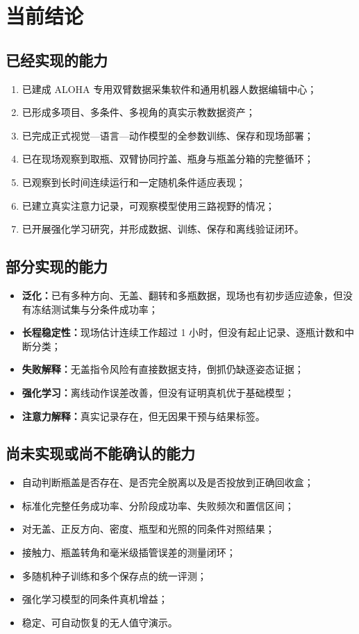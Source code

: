 \chapter{当前结论}

\section{已经实现的能力}

\begin{enumerate}
  \item 已建成 ALOHA 专用双臂数据采集软件和通用机器人数据编辑中心；
  \item 已形成多项目、多条件、多视角的真实示教数据资产；
  \item 已完成正式视觉—语言—动作模型的全参数训练、保存和现场部署；
  \item 已在现场观察到取瓶、双臂协同拧盖、瓶身与瓶盖分箱的完整循环；
  \item 已观察到长时间连续运行和一定随机条件适应表现；
  \item 已建立真实注意力记录，可观察模型使用三路视野的情况；
  \item 已开展强化学习研究，并形成数据、训练、保存和离线验证闭环。
\end{enumerate}

\section{部分实现的能力}

\begin{itemize}
  \item \textbf{泛化：}已有多种方向、无盖、翻转和多瓶数据，现场也有初步适应迹象，但没有冻结测试集与分条件成功率；
  \item \textbf{长程稳定性：}现场估计连续工作超过 1 小时，但没有起止记录、逐瓶计数和中断分类；
  \item \textbf{失败解释：}无盖指令风险有直接数据支持，倒抓仍缺逐姿态证据；
  \item \textbf{强化学习：}离线动作误差改善，但没有证明真机优于基础模型；
  \item \textbf{注意力解释：}真实记录存在，但无因果干预与结果标签。
\end{itemize}

\section{尚未实现或尚不能确认的能力}

\begin{itemize}
  \item 自动判断瓶盖是否存在、是否完全脱离以及是否投放到正确回收盒；
  \item 标准化完整任务成功率、分阶段成功率、失败频次和置信区间；
  \item 对无盖、正反方向、密度、瓶型和光照的同条件对照结果；
  \item 接触力、瓶盖转角和毫米级插管误差的测量闭环；
  \item 多随机种子训练和多个保存点的统一评测；
  \item 强化学习模型的同条件真机增益；
  \item 稳定、可自动恢复的无人值守演示。
\end{itemize}

